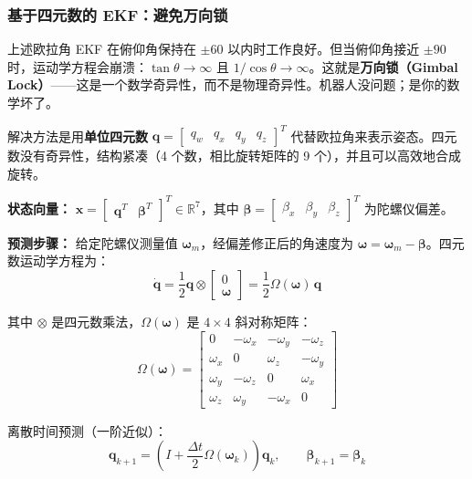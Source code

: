 \subsubsection{基于四元数的 EKF：避免万向锁}

上述欧拉角 EKF 在俯仰角保持在 $\pm 60$\textdegree{} 以内时工作良好。但当俯仰角接近 $\pm 90$\textdegree{} 时，运动学方程会崩溃：$\tan\theta \to \infty$ 且 $1/\cos\theta \to \infty$。这就是\textbf{万向锁（Gimbal Lock）}——这是一个数学奇异性，而不是物理奇异性。机器人没问题；是你的数学坏了。

解决方法是用\textbf{单位四元数} $\mathbf{q} = \begin{bmatrix} q_w & q_x & q_y & q_z \end{bmatrix}^T$ 代替欧拉角来表示姿态。四元数没有奇异性，结构紧凑（4 个数，相比旋转矩阵的 9 个），并且可以高效地合成旋转。

\textbf{状态向量：} $\mathbf{x} = \begin{bmatrix} \mathbf{q}^T & \boldsymbol{\beta}^T \end{bmatrix}^T \in \mathbb{R}^7$，其中 $\boldsymbol{\beta} = \begin{bmatrix} \beta_x & \beta_y & \beta_z \end{bmatrix}^T$ 为陀螺仪偏差。

\textbf{预测步骤：} 给定陀螺仪测量值 $\boldsymbol{\omega}_m$，经偏差修正后的角速度为 $\boldsymbol{\omega} = \boldsymbol{\omega}_m - \boldsymbol{\beta}$。四元数运动学方程为：
\begin{equation}
\dot{\mathbf{q}} = \frac{1}{2}\mathbf{q} \otimes \begin{bmatrix} 0 \\ \boldsymbol{\omega} \end{bmatrix}
= \frac{1}{2}\Omega(\boldsymbol{\omega})\,\mathbf{q}
\end{equation}

其中 $\otimes$ 是四元数乘法，$\Omega(\boldsymbol{\omega})$ 是 $4\times 4$ 斜对称矩阵：
\begin{equation}
\Omega(\boldsymbol{\omega}) = \begin{bmatrix}
0 & -\omega_x & -\omega_y & -\omega_z \\
\omega_x & 0 & \omega_z & -\omega_y \\
\omega_y & -\omega_z & 0 & \omega_x \\
\omega_z & \omega_y & -\omega_x & 0
\end{bmatrix}
\end{equation}

离散时间预测（一阶近似）：
\begin{equation}
\mathbf{q}_{k+1} = \left(I + \frac{\Delta t}{2}\Omega(\boldsymbol{\omega}_k)\right)\mathbf{q}_k, \qquad
\boldsymbol{\beta}_{k+1} = \boldsymbol{\beta}_k
\end{equation}

